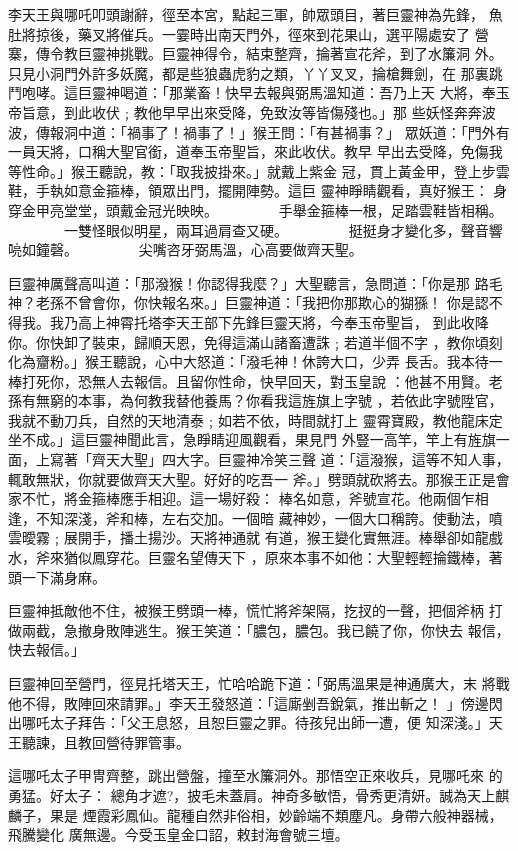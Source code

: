 \begin{pinyinscope}
{李天王與哪吒叩頭謝辭，徑至本宮，點起三軍，帥眾頭目，著巨靈神為先鋒，
魚肚將掠後，藥叉將催兵。一霎時出南天門外，徑來到花果山，選平陽處安了
營寨，傳令教巨靈神挑戰。巨靈神得令，結束整齊，掄著宣花斧，到了水簾洞
外。只見小洞門外許多妖魔，都是些狼蟲虎豹之類，丫丫叉叉，掄槍舞劍，在
那裏跳鬥咆哮。這巨靈神喝道：「那業畜！快早去報與弼馬溫知道：吾乃上天
大將，奉玉帝旨意，到此收伏﹔教他早早出來受降，免致汝等皆傷殘也。」那
些妖怪奔奔波波，傳報洞中道：「禍事了！禍事了！」猴王問：「有甚禍事？」
眾妖道：「門外有一員天將，口稱大聖官銜，道奉玉帝聖旨，來此收伏。教早
早出去受降，免傷我等性命。」猴王聽說，教：「取我披掛來。」就戴上紫金
冠，貫上黃金甲，登上步雲鞋，手執如意金箍棒，領眾出門，擺開陣勢。這巨
靈神睜睛觀看，真好猴王：
        身穿金甲亮堂堂，頭戴金冠光映映。
　　　　手舉金箍棒一根，足踏雲鞋皆相稱。
　　　　一雙怪眼似明星，兩耳過肩查又硬。
　　　　挺挺身才變化多，聲音響喨如鐘磬。
　　　　尖嘴咨牙弼馬溫，心高要做齊天聖。

巨靈神厲聲高叫道：「那潑猴！你認得我麼？」大聖聽言，急問道：「你是那
路毛神？老孫不曾會你，你快報名來。」巨靈神道：「我把你那欺心的猢猻！
你是認不得我。我乃高上神霄托塔李天王部下先鋒巨靈天將，今奉玉帝聖旨，
到此收降你。你快卸了裝束，歸順天恩，免得這滿山諸畜遭誅﹔若道半個不字
，教你頃刻化為齏粉。」猴王聽說，心中大怒道：「潑毛神！休誇大口，少弄
長舌。我本待一棒打死你，恐無人去報信。且留你性命，快早回天，對玉皇說
：他甚不用賢。老孫有無窮的本事，為何教我替他養馬？你看我這旌旗上字號
，若依此字號陞官，我就不動刀兵，自然的天地清泰﹔如若不依，時間就打上
靈霄寶殿，教他龍床定坐不成。」這巨靈神聞此言，急睜睛迎風觀看，果見門
外豎一高竿，竿上有旌旗一面，上寫著「齊天大聖」四大字。巨靈神冷笑三聲
道：「這潑猴，這等不知人事，輒敢無狀，你就要做齊天大聖。好好的吃吾一
斧。」劈頭就砍將去。那猴王正是會家不忙，將金箍棒應手相迎。這一場好殺：
棒名如意，斧號宣花。他兩個乍相逢，不知深淺，斧和棒，左右交加。一個暗
藏神妙，一個大口稱誇。使動法，噴雲曖霧﹔展開手，播土揚沙。天將神通就
有道，猴王變化實無涯。棒舉卻如龍戲水，斧來猶似鳳穿花。巨靈名望傳天下
，原來本事不如他：大聖輕輕掄鐵棒，著頭一下滿身麻。

巨靈神抵敵他不住，被猴王劈頭一棒，慌忙將斧架隔，扢扠的一聲，把個斧柄
打做兩截，急撤身敗陣逃生。猴王笑道：「膿包，膿包。我已饒了你，你快去
報信，快去報信。」

巨靈神回至營門，徑見托塔天王，忙哈哈跪下道：「弼馬溫果是神通廣大，末
將戰他不得，敗陣回來請罪。」李天王發怒道：「這廝剉吾銳氣，推出斬之！
」傍邊閃出哪吒太子拜告：「父王息怒，且恕巨靈之罪。待孩兒出師一遭，便
知深淺。」天王聽諫，且教回營待罪管事。

這哪吒太子甲冑齊整，跳出營盤，撞至水簾洞外。那悟空正來收兵，見哪吒來
的勇猛。好太子：
總角才遮?，披毛未蓋肩。神奇多敏悟，骨秀更清妍。誠為天上麒麟子，果是
煙霞彩鳳仙。龍種自然非俗相，妙齡端不類塵凡。身帶六般神器械，飛騰變化
廣無邊。今受玉皇金口詔，敕封海會號三壇。

}
\end{pinyinscope}
